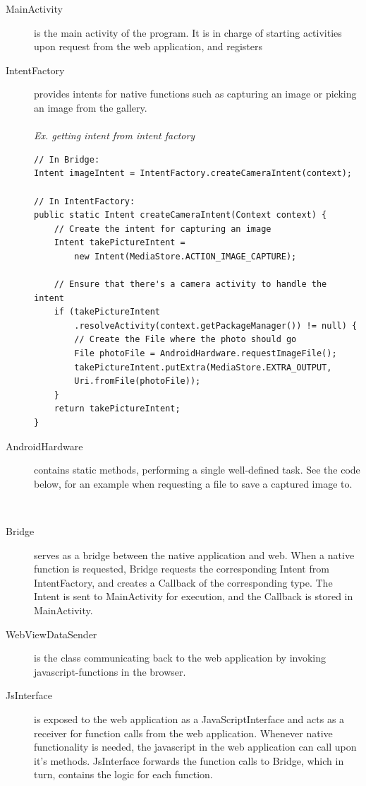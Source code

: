 \begin{description}
	\item[MainActivity] is the main activity of the program. It is in charge of starting activities upon request from the web application, and registers 
	
	
	\item[IntentFactory] provides intents for native functions such as capturing an image or picking an image from the gallery. 
	\\\\
	\emph{Ex. getting intent from intent factory}
	
	\begin{lstlisting}
// In Bridge:
Intent imageIntent = IntentFactory.createCameraIntent(context);
		
// In IntentFactory:
public static Intent createCameraIntent(Context context) {
	// Create the intent for capturing an image
	Intent takePictureIntent = 
		new Intent(MediaStore.ACTION_IMAGE_CAPTURE);
	
	// Ensure that there's a camera activity to handle the intent
	if (takePictureIntent
		.resolveActivity(context.getPackageManager()) != null) {
		// Create the File where the photo should go
		File photoFile = AndroidHardware.requestImageFile();
		takePictureIntent.putExtra(MediaStore.EXTRA_OUTPUT,
		Uri.fromFile(photoFile));
	}
	return takePictureIntent;
}
\end{lstlisting}
	
	\item[AndroidHardware] contains static methods, performing a single well-defined task. See the code below, for an example when requesting a file to save a captured image to.
	\begin{lstlisting}
	
	\end{lstlisting}
	
	\item[Bridge] serves as a bridge between the native application and web. When a native function is requested, Bridge requests the corresponding Intent from IntentFactory, and creates a Callback of the corresponding type. The Intent is sent to MainActivity for execution, and the Callback is stored in MainActivity.
	
	\item[WebViewDataSender] is the class communicating back to the web application by invoking javascript-functions in the browser.
	
	\item[JsInterface] is exposed to the web application as a JavaScriptInterface and acts as a receiver for function calls from the web application. Whenever native functionality is needed, the javascript in the web application can call upon it's methods. JsInterface forwards the function calls to Bridge, which in turn, contains the logic for each function.
	

\end{description}

